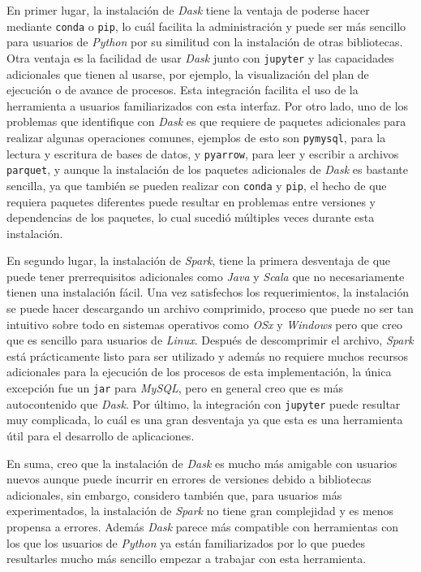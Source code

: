 En primer lugar, la instalación de \textit{Dask} tiene la ventaja de poderse hacer mediante \texttt{conda} o \texttt{pip}, lo cuál facilita la administración y puede ser más sencillo para usuarios de \textit{Python} por su similitud con la instalación de otras bibliotecas. Otra ventaja es la facilidad de usar \textit{Dask} junto con \texttt{jupyter} y las capacidades adicionales que tienen al usarse, por ejemplo, la visualización del plan de ejecución o de avance de procesos. Esta integración facilita el uso de la herramienta a usuarios familiarizados con esta interfaz. Por otro lado, uno de los problemas que identifique con \textit{Dask} es que requiere de paquetes adicionales para realizar algunas operaciones comunes, ejemplos de esto son \texttt{pymysql}, para la lectura y escritura de bases de datos, y \texttt{pyarrow}, para leer y escribir a archivos \texttt{parquet}, y aunque la instalación de los paquetes adicionales de \textit{Dask} es bastante sencilla, ya que también se pueden realizar con \texttt{conda} y \texttt{pip}, el hecho de que requiera paquetes diferentes puede resultar en problemas entre versiones y dependencias de los paquetes, lo cual sucedió múltiples veces durante esta instalación.

En segundo lugar, la instalación de \textit{Spark}, tiene la primera desventaja de que puede tener prerrequisitos adicionales como \textit{Java} y \textit{Scala} que no necesariamente tienen una instalación fácil. Una vez satisfechos los requerimientos, la instalación se puede hacer descargando un archivo comprimido, proceso que puede no ser tan intuitivo sobre todo en sistemas operativos como \textit{OSx} y \textit{Windows} pero que creo que es sencillo para usuarios de \textit{Linux}. Después de descomprimir el archivo, \textit{Spark} está prácticamente listo para ser utilizado y además no requiere muchos recursos adicionales para la ejecución de los procesos de esta implementación, la única excepción fue un \texttt{jar} para \textit{MySQL}, pero en general creo que es más autocontenido que \textit{Dask}. Por último, la integración con \texttt{jupyter} puede resultar muy complicada, lo cuál es una gran desventaja ya que esta es una herramienta útil para el desarrollo de aplicaciones.

En suma, creo que la instalación de \textit{Dask} es mucho más amigable con usuarios nuevos aunque puede incurrir en errores de versiones debido a bibliotecas adicionales, sin embargo, considero también que, para usuarios más experimentados, la instalación de \textit{Spark} no tiene gran complejidad y es menos propensa a errores. Además \textit{Dask} parece más compatible con herramientas con los que los usuarios de \textit{Python} ya están familiarizados por lo que puedes resultarles mucho más sencillo empezar a trabajar con esta herramienta. 

